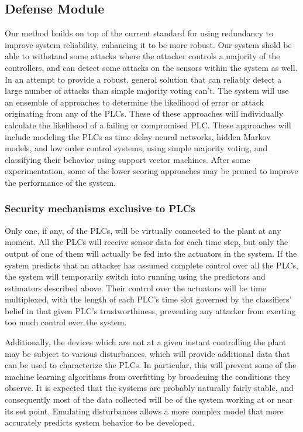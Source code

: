 \documentclass[10pt,twocolumn]{IEEEtran}
\begin{document}
\subsection{Defense Module} \label{sec:def}
Our method builds on top of the current standard for using redundancy to improve system reliability, enhancing it to be more robust.
Our system shold be able to withstand some attacks where the attacker controls a majority of the controllers, and can detect some attacks on the sensors within the system as well.
In an attempt to provide a robust, general solution that can reliably detect a large number of attacks than simple majority voting can't.
The system will use an ensemble of approaches to determine the likelihood of error or attack originating from any of the PLCs.
These of these approaches will individually calculate the likelihood of a failing or compromised PLC.
These approaches will include modeling the PLCs as time delay neural networks, hidden Markov models, and low order control systems, using simple majority voting, and classifying their behavior using support vector machines.
After some experimentation, some of the lower scoring approaches may be pruned to improve the performance of the system.

\subsubsection{Security mechanisms exclusive to PLCs}
Only one, if any, of the PLCs, will be virtually connected to the plant at any moment.
All the PLCs will receive sensor data for each time step, but only the output of one of them will actually be fed into the actuators in the system.
If the system predicts that an attacker has assumed complete control over all the PLCs, the system will temporarily switch into running using the predictors and estimators described above.
Their control over the actuators will be time multiplexed, with the length of each PLC's time slot governed by the classifiers' belief in that given PLC's trustworthiness, preventing any attacker from exerting too much control over the system.

Additionally, the devices which are not at a given instant controlling the plant may be subject to various disturbances, which will provide additional data that can be used to characterize the PLCs.
In particular, this will prevent some of the machine learning algorithms from overfitting by broadening the conditions they observe.
It is expected that the systems are probably naturally fairly stable, and consequently most of the data collected will be of the system working at or near its set point.
Emulating disturbances allows a more complex model that more accurately predicts system behavior to be developed.
\end{document}
